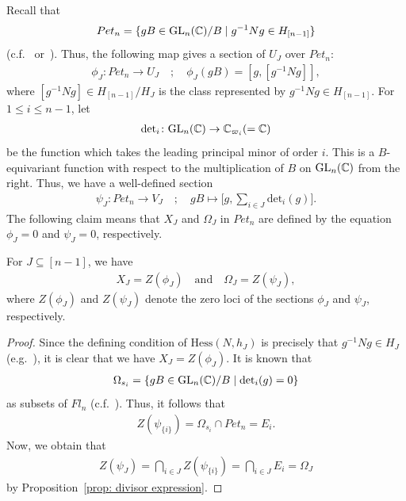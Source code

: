 Recall that 
\begin{align*}
Pet_{n} = \{gB \in {\rm GL}_n({\mathbb C})/B \mid g^{-1}Ng\in H_{[n-1]}\}
\end{align*}
(c.f.~\cite{Insko-Tymoczko,Rietsch06} or~\cite[Sect.~2]{ty}).
Thus, the following map gives a section of $U_{J}$ over $Pet_{n}$:
\begin{align*}
\phi_J \colon  Pet_{n} \rightarrow U_{J}
\quad ; \quad 
\phi_J(gB) = [g, [g^{-1}Ng]],
\end{align*}
where $[g^{-1}Ng]\in H_{[n-1]}/H_J$ is the class represented by $g^{-1}Ng \in H_{[n-1]}$. For $1\le i\le n-1$, let 
\begin{align*}
\text{det}_i \colon {\rm GL}_n({\mathbb C})\rightarrow {\mathbb C}_{\varpi_i}(={\mathbb C})
\end{align*} 
be the function which takes the leading principal minor of order $i$. This is a $B$-equivariant function with respect to the multiplication of $B$ on ${\rm GL}_n({\mathbb C})$ from the right. Thus, we have a well-defined section 
\begin{align*}
\psi_J \colon  Pet_{n} \rightarrow V_J
\quad ; \quad
gB\mapsto \Big[g,\sum_{i\in J}\text{det}_i(g)\Big].
\end{align*}
The following claim means that $X_J$ and $\Omega_J$ in $Pet_{n}$ are defined by the equation $\phi_J=0$ and $\psi_J=0$, respectively.

\begin{prop}\label{prop: zero locus}
For $J\subseteq[n-1]$, we have 
\begin{align*}
 X_J=Z(\phi_J) \quad \text{and} \quad \Omega_J =Z(\psi_J) ,
\end{align*}
where $Z(\phi_J)$ and $Z(\psi_J)$ denote the zero loci of the sections $\phi_J$ and $\psi_J$, respectively.
\end{prop}

\begin{proof}
Since the defining condition of $\text{Hess}(N,h_{J})$ is precisely that $g^{-1}Ng\in H_{J}$ (e.g.~\cite[Sect.~2]{ty}), it is clear that we have $X_J=Z(\phi_J)$. It is known that 
\begin{align*}
\Omega_{s_i} = \{gB \in {\rm GL}_n({\mathbb C})/B \mid \text{det}_i(g)=0\}
\end{align*}
as subsets of $Fl_n$ (c.f.~\cite[Proposition~9 in Sect.~10.6]{fult97}). Thus, it follows that
\begin{align*}
Z(\psi_{\{i\}}) = \Omega_{s_i}\cap Pet_{n}=E_i.
\end{align*}
Now, we obtain that
\begin{align*}
Z(\psi_J) = \bigcap_{i\in J} Z(\psi_{\{i\}}) = \bigcap_{i\in J} E_i = \Omega_{J}
\end{align*}
by Proposition~\ref{prop: divisor expression}.
\end{proof}

